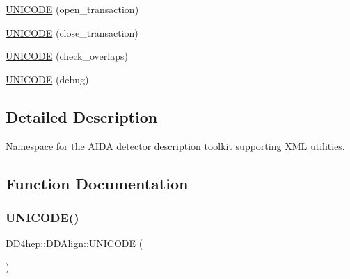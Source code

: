 \begin{DoxyCompactItemize}
\item 
\hyperlink{namespace_d_d4hep_1_1_d_d_align_a3e55e7bb8f6ced963649271e80d38ef7}{U\+N\+I\+C\+O\+DE} (open\+\_\+transaction)
\item 
\hyperlink{namespace_d_d4hep_1_1_d_d_align_ad8b81995e9e734f3de4f7b3fcc71b969}{U\+N\+I\+C\+O\+DE} (close\+\_\+transaction)
\item 
\hyperlink{namespace_d_d4hep_1_1_d_d_align_aa5e5a3c901780b457658bd9825bb376a}{U\+N\+I\+C\+O\+DE} (check\+\_\+overlaps)
\item 
\hyperlink{namespace_d_d4hep_1_1_d_d_align_ae4e3eb8b7bab297efc0079f41e26d25f}{U\+N\+I\+C\+O\+DE} (debug)
\end{DoxyCompactItemize}


\subsection{Detailed Description}
Namespace for the A\+I\+DA detector description toolkit supporting \hyperlink{namespace_d_d4hep_1_1_x_m_l}{X\+ML} utilities. 

\subsection{Function Documentation}
\hypertarget{namespace_d_d4hep_1_1_d_d_align_a92ddad3190005e748fdd69016eba6d3d}{}\label{namespace_d_d4hep_1_1_d_d_align_a92ddad3190005e748fdd69016eba6d3d} 
\subsubsection{\texorpdfstring{U\+N\+I\+C\+O\+D\+E()}{UNICODE()}\hspace{0.1cm}{\footnotesize\ttfamily [1/16]}}
{\footnotesize\ttfamily D\+D4hep\+::\+D\+D\+Align\+::\+U\+N\+I\+C\+O\+DE (\begin{DoxyParamCaption}\item[{Detector\+Alignment}]{ }\end{DoxyParamCaption})}

\hypertarget{namespace_d_d4hep_1_1_d_d_align_adda071bc0503c76adf54dfbf8cc47c98}{}\label{namespace_d_d4hep_1_1_d_d_align_adda071bc0503c76adf54dfbf8cc47c98} 
